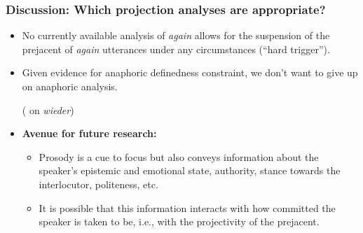 \documentclass[pdf,xcolor=table,envcountsect,handout]{beamer}
\begin{document}
\begin{frame}
\frametitle{Discussion: Which projection analyses are appropriate?}


\begin{itemize}[topsep=-5pt]

\item No currently available analysis of {\em again} allows for the suspension of the prejacent of {\em again} utterances under any circumstances (``hard trigger'').

\medskip

\item Given  evidence for anaphoric definedness constraint, we don't want to give up on anaphoric analysis. \hfill \begin{tiny}(\citealt{tiemann-etal11,tiemann-etal14} on {\em wieder})\end{tiny}

\medskip
\pause

\item {\bf Avenue for future research:} 

\begin{itemize}[leftmargin=3ex]

\item Prosody is a cue to focus but also conveys information about the speaker's epistemic and emotional state, authority, stance towards the interlocutor, politeness, etc. 

\item It is possible that this information interacts with how committed the speaker is taken to be, i.e., with the projectivity of the prejacent.  

\end{itemize}

\end{itemize}

\end{frame}
\end{document}

